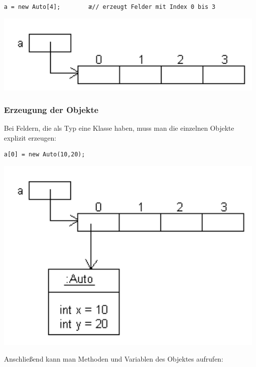 \begin{lstlisting}
a = new Auto[4];        æ// erzeugt Felder mit Index 0 bis 3
\end{lstlisting}

\begin{minipage}{0.45\textwidth}
\includegraphics[width=1.0\textwidth]{./inf/SEKII/18_Java_Arrays/Erzeugung1.png}
\end{minipage}

\subsubsection{Erzeugung der Objekte}

Bei Feldern, die als Typ eine Klasse haben, muss man die einzelnen Objekte explizit erzeugen:

\begin{lstlisting}
a[0] = new Auto(10,20);
\end{lstlisting}

\begin{minipage}{0.45\textwidth}
\includegraphics[width=1.0\textwidth]{./inf/SEKII/18_Java_Arrays/Erzeugung2.png}
\end{minipage}

Anschließend kann man Methoden und Variablen des Objektes aufrufen:

